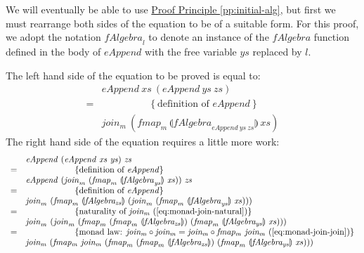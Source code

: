 \documentclass{jfp1}
\newcommand{\fold}[1]{\llparenthesis #1 \rrparenthesis}
\newcommand{\eqAnnotation}[1]{\hspace{2cm}\left\{\textrm{#1}\right\}}
\newcommand{\proofprinref}[1]{\hyperref[#1]{Proof Principle \ref*{#1}}}
\begin{document}
\begin{proof*}
  We will eventually be able to use \proofprinref{pp:initial-alg}, but
  first we must rearrange both sides of the equation to be of a
  suitable form. For this proof, we adopt the notation
  $\mathit{fAlgebra}_l$ to denote an instance of the
  $\mathit{fAlgebra}$ function defined in the body of
  $\mathit{eAppend}$ with the free variable $\mathit{ys}$ replaced by
  $l$.

  The left hand side of the equation to be proved is equal to:
  \begin{displaymath}
    \begin{array}{cl}
       &\mathit{eAppend}~\mathit{xs}~(\mathit{eAppend}~\mathit{ys}~\mathit{zs}) \\
       =&\eqAnnotation{definition of $\mathit{eAppend}$} \\
       &\mathit{join_m}~(\mathit{fmap_m}~\fold{\mathit{fAlgebra}_{\mathit{eAppend}~\mathit{ys}~\mathit{zs}}}~\mathit{xs})
    \end{array}
  \end{displaymath}
  The right hand side of the equation requires a little more work:
  \begin{displaymath}
    \begin{array}{cl}
      &\mathit{eAppend}~(\mathit{eAppend}~\mathit{xs}~\mathit{ys})~\mathit{zs} \\
      =&\eqAnnotation{definition of $\mathit{eAppend}$} \\
      &\mathit{eAppend}~(\mathit{join}_m~(\mathit{fmap}_m~\fold{\mathit{fAlgebra}_{\mathit{ys}}}~\mathit{xs}))~\mathit{zs} \\
      =&\eqAnnotation{definition of $\mathit{eAppend}$} \\
      &\mathit{join}_m~(\mathit{fmap}_m~\fold{\mathit{fAlgebra_{zs}}}~(\mathit{join}_m~(\mathit{fmap}_m~\fold{\mathit{fAlgebra}_{\mathit{ys}}}~\mathit{xs}))) \\
      =&\eqAnnotation{naturality of $\mathit{join_m}$ (\autoref{eq:monad-join-natural})} \\
      &\mathit{join}_m~(\mathit{join}_m~(\mathit{fmap}_m~(\mathit{fmap}_m~\fold{\mathit{fAlgebra_{zs}}})~(\mathit{fmap}_m~\fold{\mathit{fAlgebra_{ys}}}~\mathit{xs}))) \\
      =&\eqAnnotation{monad law: $\mathit{join_m} \circ \mathit{join_m} = \mathit{join_m} \circ \mathit{fmap_m}~\mathit{join_m}$ (\autoref{eq:monad-join-join})} \\
      &\mathit{join_m}~(\mathit{fmap_m}~\mathit{join_m}~(\mathit{fmap}_m~(\mathit{fmap}_m~\fold{\mathit{fAlgebra_{zs}}})~(\mathit{fmap}_m~\fold{\mathit{fAlgebra_{ys}}}~\mathit{xs}))) \\

\end{array}
\end{displaymath}
\end{proof*}
\end{document}
